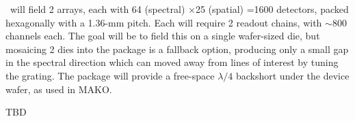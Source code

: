 \name\ will field 2 arrays, each with 64 (spectral) $\times$25 (spatial) =1600 detectors, packed hexagonally with a 1.36-mm pitch.  Each will require 2 readout chains, with $\sim$800 channels each.  The goal will be to field this on a single wafer-sized die, but mosaicing 2 dies into the package is a fallback option, producing only a small gap in the spectral direction which can moved away from lines of interest by tuning the grating.  The package will provide a free-space $\lambda/4$ backshort under the device wafer, as used in MAKO.

\vspace{0.05in}{\bf Horn array.}  {\color{red} TBD}

\begin{figure}[t!]
\begin{center}
\captionbaseline\caption{\small {}}  
\linefig\vspace{-0.35in} \label{fig:lenses}
\end{center}
\end{figure}


